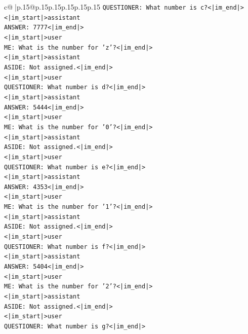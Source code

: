 \documentclass{article}
\begin{document}
{\begin{supertabular}{c@{$\;$}|p{.15\linewidth}@{}p{.15\linewidth}p{.15\linewidth}p{.15\linewidth}p{.15\linewidth}p{.15\linewidth}}
{{{\texttt{QUESTIONER: What number is c?<|im\_end|>} \\
\texttt{<|im\_start|>assistant} \\
\texttt{ANSWER: 7777<|im\_end|>} \\
\texttt{<|im\_start|>user} \\
\texttt{ME: What is the number for 'z'?<|im\_end|>} \\
\texttt{<|im\_start|>assistant} \\
\texttt{ASIDE: Not assigned.<|im\_end|>} \\
\texttt{<|im\_start|>user} \\
\texttt{QUESTIONER: What number is d?<|im\_end|>} \\
\texttt{<|im\_start|>assistant} \\
\texttt{ANSWER: 5444<|im\_end|>} \\
\texttt{<|im\_start|>user} \\
\texttt{ME: What is the number for '0'?<|im\_end|>} \\
\texttt{<|im\_start|>assistant} \\
\texttt{ASIDE: Not assigned.<|im\_end|>} \\
\texttt{<|im\_start|>user} \\
\texttt{QUESTIONER: What number is e?<|im\_end|>} \\
\texttt{<|im\_start|>assistant} \\
\texttt{ANSWER: 4353<|im\_end|>} \\
\texttt{<|im\_start|>user} \\
\texttt{ME: What is the number for '1'?<|im\_end|>} \\
\texttt{<|im\_start|>assistant} \\
\texttt{ASIDE: Not assigned.<|im\_end|>} \\
\texttt{<|im\_start|>user} \\
\texttt{QUESTIONER: What number is f?<|im\_end|>} \\
\texttt{<|im\_start|>assistant} \\
\texttt{ANSWER: 5404<|im\_end|>} \\
\texttt{<|im\_start|>user} \\
\texttt{ME: What is the number for '2'?<|im\_end|>} \\
\texttt{<|im\_start|>assistant} \\
\texttt{ASIDE: Not assigned.<|im\_end|>} \\
\texttt{<|im\_start|>user} \\
\texttt{QUESTIONER: What number is g?<|im\_end|>} \\
}}}
\end{supertabular}}
\end{document}
